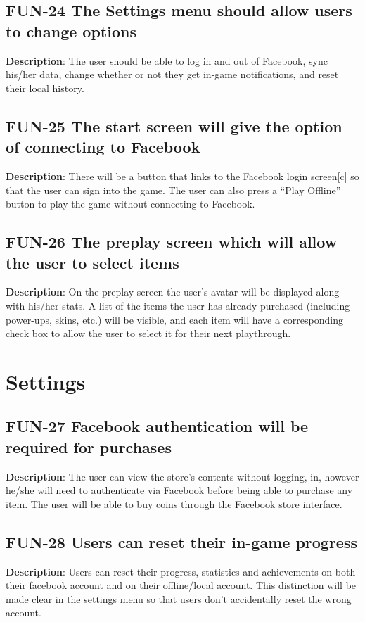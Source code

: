 \subsection{FUN-24 The Settings menu should allow users to change options}
\textbf{Description}: The user should be able to log in and out of
Facebook, sync his/her data, change whether or not they get in-game
notifications, and reset their local history.

\subsection{FUN-25 The start screen will give the option of connecting to Facebook}
\textbf{Description}: There will be a button that links to the Facebook
login screen{[}c{]} so that the user can sign into the game. The user
can also press a \textquotedblleft{}Play Offline\textquotedblright{}
button to play the game without connecting to Facebook.

\subsection{FUN-26 The preplay screen which will allow the user to select items}
\textbf{Description}: On the preplay screen the user\textquoteright{}s
avatar will be displayed along with his/her stats. A list of the items
the user has already purchased (including power-ups, skins, etc.)
will be visible, and each item will have a corresponding check box
to allow the user to select it for their next playthrough.

\section{Settings}

\subsection{FUN-27 Facebook authentication will be required for purchases}
\textbf{Description}: The user can view the store\textquoteright{}s
contents without logging, in, however he/she will need to authenticate
via Facebook before being able to purchase any item. The user will
be able to buy coins through the Facebook store interface.

\subsection{FUN-28 Users can reset their in-game progress}
\textbf{Description}: Users can reset their progress, statistics and
achievements on both their facebook account and on their offline/local
account. This distinction will be made clear in the settings menu
so that users don\textquoteright{}t accidentally reset the wrong account.

